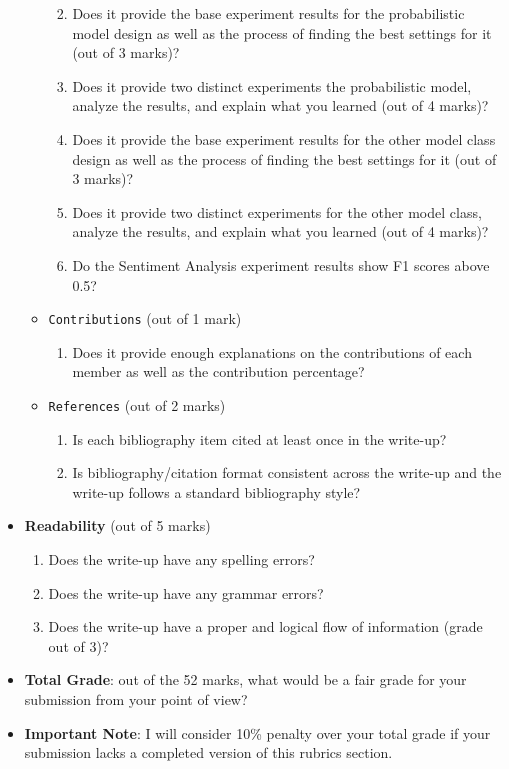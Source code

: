 \begin{itemize}
\begin{itemize}
\begin{enumerate}
                \answerTODO{}
            \item Does it provide the base experiment results for the probabilistic model design as well as the process of finding the best settings for it (out of 3 marks)?
                \answerTODO{}
            \item Does it provide two distinct experiments the probabilistic model, analyze the results, and explain what you learned (out of 4 marks)?
                \answerTODO{}
            \item Does it provide the base experiment results for the other model class design as well as the process of finding the best settings for it (out of 3 marks)?
                \answerTODO{}
            \item Does it provide two distinct experiments for the other model class, analyze the results, and explain what you learned (out of 4 marks)?
                \answerTODO{}
            \item Do the Sentiment Analysis experiment results show F1 scores above 0.5? 
                \answerTODO{}
        \end{enumerate}
        \item \texttt{Contributions} (out of 1 mark)
        \begin{enumerate}
            \item Does it provide enough explanations on the contributions of each member as well as the contribution percentage?
                \answerTODO{}
        \end{enumerate}
        \item \texttt{References} (out of 2 marks)
        \begin{enumerate}
            \item Is each bibliography item cited at least once in the write-up?
                \answerTODO{}
            \item Is bibliography/citation format consistent across the write-up and the write-up follows a standard bibliography style?
                \answerTODO{}
        \end{enumerate}
    \end{itemize}
    \item \textbf{Readability} (out of 5 marks)
    \begin{enumerate}
        \item Does the write-up have any spelling errors?
            \answerTODO{}
        \item Does the write-up have any grammar errors?
            \answerTODO{}
        \item Does the write-up have a proper and logical flow of information (grade out of 3)?
            \answerTODO{}
    \end{enumerate}
    \item \textbf{Total Grade}: out of the 52 marks, what would be a fair grade for your submission from your point of view?
        \answerTODO{}
    \item \textbf{Important Note}: I will consider 10\% penalty over your total grade if your submission lacks a completed version of this rubrics section.
\end{itemize}
